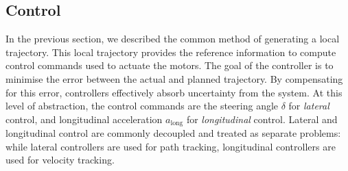 



\subsection{Control}
\label{sec:control}

In the previous section, we described the common method of generating a local trajectory.
This local trajectory provides the reference information to compute control commands used to actuate the motors.
The goal of the controller is to minimise the error between the actual and planned trajectory.
By compensating for this error, controllers effectively absorb uncertainty from the system.
At this level of abstraction, the control commands are the steering angle $\delta$ for \emph{lateral} control, and longitudinal acceleration $a_{\text{long}}$ for \emph{longitudinal} control.
Lateral and longitudinal control are commonly decoupled and treated as separate problems:
while lateral controllers are used for path tracking, longitudinal controllers are used for velocity tracking.

